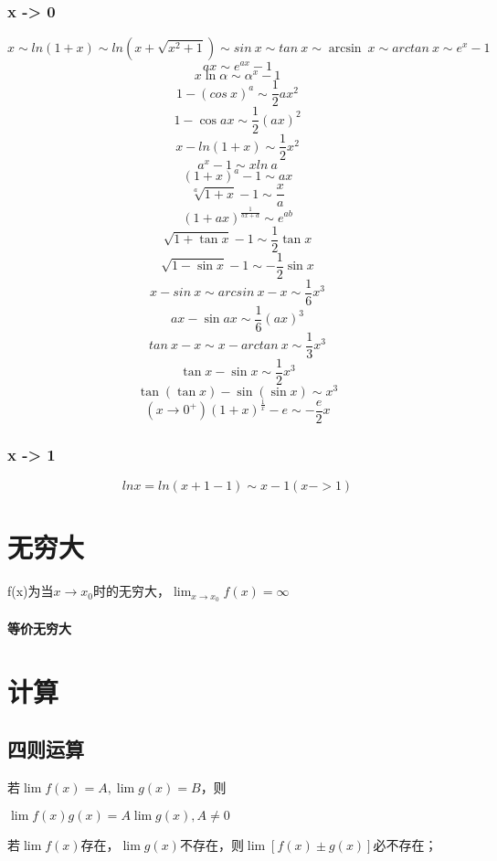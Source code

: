 \subsubsection{x -> 0}
\[x \sim ln(1 + x) \sim ln(x + \sqrt{x^2 + 1}) \sim sin\ x \sim tan\ x \sim \arcsin\ x \sim arctan\ x \sim e^x - 1\]
\[ax \sim e^{ax} - 1\]
\[x\ln\alpha \sim \alpha^x - 1\]
\[1 - (cos\ x)^a \sim \frac{1}{2}ax^2\]
\[1 - \cos ax \sim \dfrac{1}{2}(ax)^2\]
\[x - ln(1 + x) \sim \frac{1}{2}x^2\]
\[a^x - 1 \sim xln\ a\]
\[(1 + x)^a - 1 \sim ax\]
\[\sqrt[a]{1 + x} - 1 \sim \frac{x}{a}\]
\[(1 + ax)^{\frac{1}{bx + d}} \sim e^{ab}\]
\[\sqrt{1 + \tan x} - 1 \sim \dfrac{1}{2}\tan x\]
\[\sqrt{1 - \sin x} - 1 \sim -\dfrac{1}{2}\sin x\]
\[x - sin\ x \sim arcsin\ x - x \sim \dfrac{1}{6}x^3\]
\[ax - \sin ax \sim \dfrac{1}{6}(ax)^3\]
\[tan\ x - x \sim x - arctan\ x \sim \dfrac{1}{3}x^3\]
\[\tan x - \sin x \sim \dfrac{1}{2}x^3\]
\[\tan(\tan x) - \sin(\sin x) \sim x^3\]
\[(x \to 0^+)(1 + x)^{\frac{1}{x}} - e \sim -\frac{e}{2}x\]

\subsubsection{x -> 1}
\begin{displaymath}
lnx = ln(x + 1 - 1) \sim x - 1 (x->1)
\end{displaymath}

\section{无穷大}
f(x)为当\(x \to x_0\)时的无穷大，\(\displaystyle \lim_{x \to x_0}f(x) = \infty\)


\paragraph{等价无穷大}




\section{计算}

\subsection{四则运算}
若\(\lim f(x) = A, \lim g(x) = B\)，则

\(\lim f(x)g(x) = A\lim g(x), A \neq 0\)

若\(\lim f(x)\)存在，\(\lim g(x)\)不存在，则\(\lim[f(x) \pm g(x)]\)必不存在；

